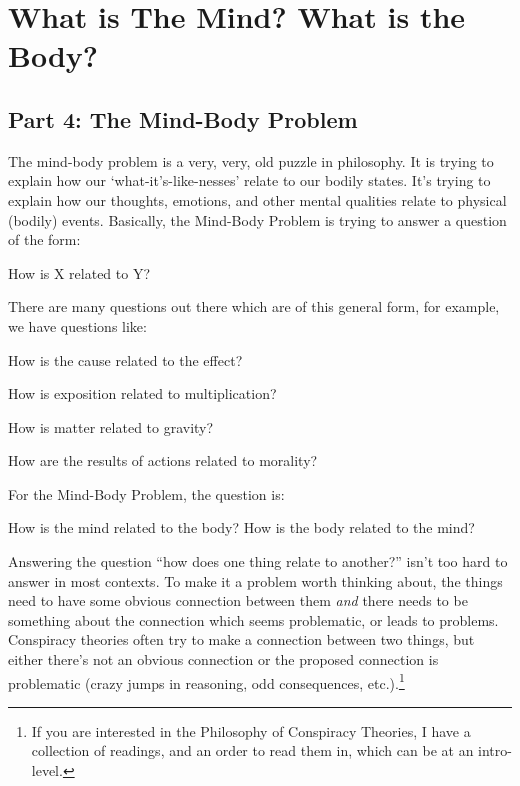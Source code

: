 \part{What is The Mind? What is the Body?}
\label{ch.modthree}

\chapter{Part 4: The Mind-Body Problem}
The mind-body problem is a very, very, old puzzle in philosophy. It is trying to explain how our `what-it's-like-nesses' relate to our bodily states. It's trying to explain how our thoughts, emotions, and other mental qualities relate to physical (bodily) events. Basically, the Mind-Body Problem is trying to answer a question of the form:

\begin{center}How is X related to Y?\end{center}

There are many questions out there which are of this general form, for example, we have questions like:
\begin{earg}
    \item[]How is the cause related to the effect?
    \item[]How is exposition related to multiplication?
    \item[]How is matter related to gravity?
    \item[]How are the results of actions related to morality?
\end{earg}
For the Mind-Body Problem, the question is:

\begin{center}How is the mind related to the body?
How is the body related to the mind?\end{center}

Answering the question “how does one thing relate to another?” isn’t too hard to answer in most contexts. To make it a problem worth thinking about, the things need to have some obvious connection between them \emph{and} there needs to be something about the connection which seems problematic, or leads to problems. Conspiracy theories often try to make a connection between two things, but either there’s not an obvious connection or the proposed connection is problematic (crazy jumps in reasoning, odd consequences, etc.).\footnote{If you are interested in the Philosophy of Conspiracy Theories, I have a collection of readings, and an order to read them in, which can be at an intro-level.}

